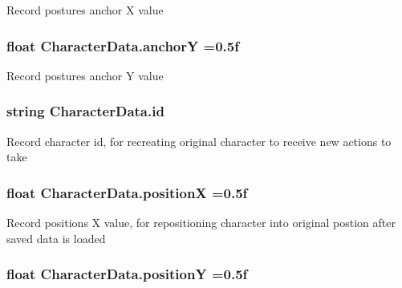 Record posture\textquotesingle{}s anchor X value 

\subsubsection[{\texorpdfstring{anchorY}{anchorY}}]{\setlength{\rightskip}{0pt plus 5cm}float Character\+Data.\+anchorY =0.\+5f}\hypertarget{class_character_data_a4ae5f8442fd6f7cda7b9230a26efb192}{}\label{class_character_data_a4ae5f8442fd6f7cda7b9230a26efb192}


Record posture\textquotesingle{}s anchor Y value 

\subsubsection[{\texorpdfstring{id}{id}}]{\setlength{\rightskip}{0pt plus 5cm}string Character\+Data.\+id}\hypertarget{class_character_data_a46d22a0d14d6ca879ee16de3a7b0e5db}{}\label{class_character_data_a46d22a0d14d6ca879ee16de3a7b0e5db}


Record character id, for recreating original character to receive new actions to take 

\subsubsection[{\texorpdfstring{positionX}{positionX}}]{\setlength{\rightskip}{0pt plus 5cm}float Character\+Data.\+positionX =0.\+5f}\hypertarget{class_character_data_a6cc49ea64576b0b23f29fd9a697d3426}{}\label{class_character_data_a6cc49ea64576b0b23f29fd9a697d3426}


Record position\textquotesingle{}s X value, for repositioning character into original postion after saved data is loaded 

\subsubsection[{\texorpdfstring{positionY}{positionY}}]{\setlength{\rightskip}{0pt plus 5cm}float Character\+Data.\+positionY =0.\+5f}\hypertarget{class_character_data_afca4055a2ea3f98e02d9ad4b4d7ece5d}{}\label{class_character_data_afca4055a2ea3f98e02d9ad4b4d7ece5d}


